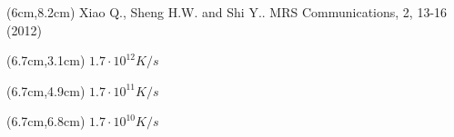 \begin{frame}
{  \begin{textblock*}{6cm}(6cm,8.2cm)
    \centering
    \scriptsize{Xiao Q., Sheng H.W. and Shi Y.. MRS Communications, 2, 13-16 (2012)}
  \end{textblock*}

  \begin{textblock*}{2cm}(6.7cm,3.1cm)
    \centering
    \scriptsize{$1.7\cdot10^{12}K/s$}
  \end{textblock*}
  
  \begin{textblock*}{2cm}(6.7cm,4.9cm)
    \centering
    \scriptsize{$1.7\cdot10^{11}K/s$}
  \end{textblock*}
  
  \begin{textblock*}{2cm}(6.7cm,6.8cm)
    \centering
    \scriptsize{$1.7\cdot10^{10}K/s$}
  \end{textblock*}
  
  }
\end{frame}